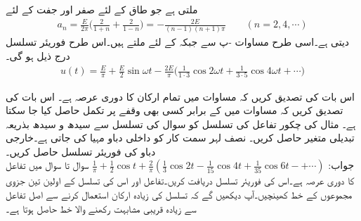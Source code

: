 ملتی ہے جو طاق  کے لئے صفر اور جفت  کے لئے 
\begin{align*}
a_n=\frac{E}{2\pi}\big(\frac{2}{1+n}+\frac{2}{1-n}\big)=-\frac{2E}{(n-1)(n+1)\pi}\quad \quad (n=2,4,\cdots)
\end{align*}
دیتی ہے۔اسی طرح مساوات -پ سے  جبکہ  کے لئے   ملتے ہیں۔اس طرح فوریئر تسلسل درج ذیل ہو گی۔
\begin{align*}
u(t)=\frac{E}{\pi}+\frac{E}{2}\sin \omega t-\frac{2E}{\pi}\big(\frac{1}{1\cdot 3}\cos 2\omega t+\frac{1}{3\cdot 5}\cos 4\omega t+\cdots\big)
\end{align*}


\quad
اس بات کی تصدیق کریں کہ مساوات  میں تمام ارکان کا دوری عرصہ  ہے۔
\quad اس بات کی تصدیق کریں کہ مساوات  میں  کے برابر کسی بھی وقفے پر تکمل حاصل کیا جا سکتا ہے۔
\quad
مثال  کی چکور تفاعل کی تسلسل کو سوال  کی تسلسل  سے سیدھ و سیدھ بذریعہ تبدیلی متغیر حاصل کریں۔ 
\quad
نصف لہر سمت کار کو  داخلی دباو مہیا کی جاتی ہے۔خارجی دباو کی فوریئر تسلسل حاصل کریں۔\\
جواب:\quad
$\tfrac{1}{\pi}+\tfrac{1}{2}\cos t+\tfrac{2}{\pi}(\tfrac{1}{3}\cos 2t-\tfrac{1}{15}\cos 4t+\tfrac{1}{35}\cos 6t-+\cdots)$
سوال  تا سوال  میں تفاعل  کا دوری عرصہ  ہے۔اس کی فوریئر تسلسل دریافت کریں۔تفاعل  اور اس کی تسلسل کے اولین تین جزوی مجموعوں کے خط کھینچیں۔آپ دیکھیں گے کہ تسلسل کی زیادہ ارکان استعمال کرنے سے اصل تفاعل سے زیادہ قریبی مشابہت رکھنے والا خط حاصل ہوتا ہے۔

